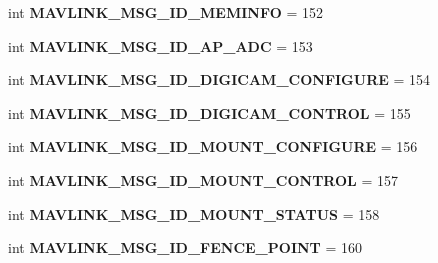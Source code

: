 \begin{DoxyCompactItemize}
int {\bfseries M\+A\+V\+L\+I\+N\+K\+\_\+\+M\+S\+G\+\_\+\+I\+D\+\_\+\+M\+E\+M\+I\+N\+FO} = 152
\item 
\mbox{\label{namespacepymavlink_1_1dialects_1_1v10_a8f304e6dc700447d504d5e9758c68ba8}} 
int {\bfseries M\+A\+V\+L\+I\+N\+K\+\_\+\+M\+S\+G\+\_\+\+I\+D\+\_\+\+A\+P\+\_\+\+A\+DC} = 153
\item 
\mbox{\label{namespacepymavlink_1_1dialects_1_1v10_ad01debd54b26083e5681aa2b0f7355a8}} 
int {\bfseries M\+A\+V\+L\+I\+N\+K\+\_\+\+M\+S\+G\+\_\+\+I\+D\+\_\+\+D\+I\+G\+I\+C\+A\+M\+\_\+\+C\+O\+N\+F\+I\+G\+U\+RE} = 154
\item 
\mbox{\label{namespacepymavlink_1_1dialects_1_1v10_a190f4841b4089adca71381c759f70635}} 
int {\bfseries M\+A\+V\+L\+I\+N\+K\+\_\+\+M\+S\+G\+\_\+\+I\+D\+\_\+\+D\+I\+G\+I\+C\+A\+M\+\_\+\+C\+O\+N\+T\+R\+OL} = 155
\item 
\mbox{\label{namespacepymavlink_1_1dialects_1_1v10_ae205285957f747bd32775a9ecefa3ca3}} 
int {\bfseries M\+A\+V\+L\+I\+N\+K\+\_\+\+M\+S\+G\+\_\+\+I\+D\+\_\+\+M\+O\+U\+N\+T\+\_\+\+C\+O\+N\+F\+I\+G\+U\+RE} = 156
\item 
\mbox{\label{namespacepymavlink_1_1dialects_1_1v10_a3d15b20d79883d6962871d316609efda}} 
int {\bfseries M\+A\+V\+L\+I\+N\+K\+\_\+\+M\+S\+G\+\_\+\+I\+D\+\_\+\+M\+O\+U\+N\+T\+\_\+\+C\+O\+N\+T\+R\+OL} = 157
\item 
\mbox{\label{namespacepymavlink_1_1dialects_1_1v10_a927e23ff833da69704477f9b37e024ff}} 
int {\bfseries M\+A\+V\+L\+I\+N\+K\+\_\+\+M\+S\+G\+\_\+\+I\+D\+\_\+\+M\+O\+U\+N\+T\+\_\+\+S\+T\+A\+T\+US} = 158
\item 
\mbox{\label{namespacepymavlink_1_1dialects_1_1v10_a9dc6c880cb67531800e075c642a01835}} 
int {\bfseries M\+A\+V\+L\+I\+N\+K\+\_\+\+M\+S\+G\+\_\+\+I\+D\+\_\+\+F\+E\+N\+C\+E\+\_\+\+P\+O\+I\+NT} = 160
\item 
\mbox{\label{namespacepymavlink_1_1dialects_1_1v10_a87328e9b010a041f5f57f2d374f3a5ff}} 

\end{DoxyCompactItemize}
